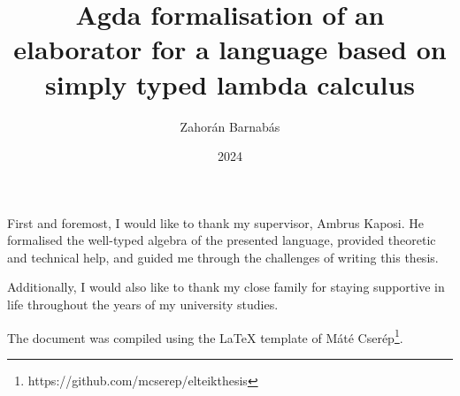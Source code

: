\documentclass[
]{elteikthesis}[2023/04/10]
\title{Agda formalisation of an elaborator for a language based on simply typed lambda calculus} %
\date{2024} %
\author{Zahorán Barnabás}
\affiliation{Associate professor} %
\begin{document}


\maketitle
%

\tableofcontents
\cleardoublepage


\cleardoublepage


\cleardoublepage


\cleardoublepage


\cleardoublepage


\cleardoublepage

\chapter*{\acklabel}
First and foremost, I would like to thank my supervisor, Ambrus Kaposi. He formalised the well-typed algebra of the presented language, provided theoretic and technical help, and guided me through the challenges of writing this thesis.

Additionally, I would also like to thank my close family for staying supportive in life throughout the years of my university studies.

The document was compiled using the LaTeX template of Máté Cserép\footnote{https://github.com/mcserep/elteikthesis}.

%

{}
\printbibliography[title=\biblabel]
\cleardoublepage




{}
\lstlistoflistings
\cleardoublepage

\printnomenclature
\end{document}
